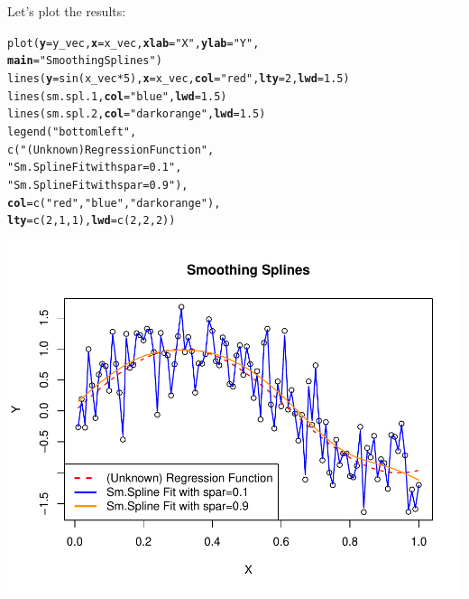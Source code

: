 \documentclass[14pt]{extreport}\usepackage[]{graphicx}\usepackage[]{xcolor}
\makeatletter
\def\maxwidth{ %
  \ifdim\Gin@nat@width>\linewidth
    \linewidth
  \else
    \Gin@nat@width
  \fi
}
\newcommand{\hlnum}[1]{\textcolor[rgb]{0.69,0.494,0}{#1}}%
\newcommand{\hlstr}[1]{\textcolor[rgb]{0.749,0.012,0.012}{#1}}%
\newcommand{\hlopt}[1]{\textcolor[rgb]{0,0,0}{#1}}%
\newcommand{\hlstd}[1]{\textcolor[rgb]{0,0,0}{#1}}%
\newcommand{\hlkwc}[1]{\textcolor[rgb]{0,0,0}{\textbf{#1}}}%
\newcommand{\hlkwd}[1]{\textcolor[rgb]{0.004,0.004,0.506}{#1}}%
\newenvironment{kframe}{%
 \def\at@end@of@kframe{}%
 \ifinner\ifhmode%
  \def\at@end@of@kframe{\end{minipage}}%
  \begin{minipage}{\columnwidth}%
 \fi\fi%
 \def\FrameCommand##1{\hskip\@totalleftmargin \hskip-\fboxsep
 \colorbox{shadecolor}{##1}\hskip-\fboxsep
     \hskip-\linewidth \hskip-\@totalleftmargin \hskip\columnwidth}%
 \MakeFramed {\advance\hsize-\width
   \@totalleftmargin\z@ \linewidth\hsize
   \@setminipage}}%
 {\par\unskip\endMakeFramed%
 \at@end@of@kframe}
\newenvironment{knitrout}{}{} %
\makeatother
\begin{document}
Let's plot the results:
\begin{knitrout}
\color{fgcolor}\begin{kframe}
\begin{alltt}
\hlkwd{plot}\hlstd{(}\hlkwc{y}\hlstd{=y_vec,} \hlkwc{x}\hlstd{=x_vec,} \hlkwc{xlab}\hlstd{=}\hlstr{"X"}\hlstd{,} \hlkwc{ylab}\hlstd{=}\hlstr{"Y"}\hlstd{,}
    \hlkwc{main}\hlstd{=}\hlstr{"Smoothing Splines"}\hlstd{)}
\hlkwd{lines}\hlstd{(}\hlkwc{y}\hlstd{=}\hlkwd{sin}\hlstd{(x_vec} \hlopt{*} \hlnum{5}\hlstd{),} \hlkwc{x}\hlstd{=x_vec,} \hlkwc{col}\hlstd{=}\hlstr{"red"}\hlstd{,} \hlkwc{lty}\hlstd{=}\hlnum{2}\hlstd{,} \hlkwc{lwd}\hlstd{=}\hlnum{1.5}\hlstd{)}
\hlkwd{lines}\hlstd{(sm.spl.1,} \hlkwc{col}\hlstd{=}\hlstr{"blue"}\hlstd{,}       \hlkwc{lwd}\hlstd{=}\hlnum{1.5}\hlstd{)}
\hlkwd{lines}\hlstd{(sm.spl.2,} \hlkwc{col}\hlstd{=}\hlstr{"darkorange"}\hlstd{,} \hlkwc{lwd}\hlstd{=}\hlnum{1.5}\hlstd{)}
\hlkwd{legend}\hlstd{(}\hlstr{"bottomleft"}\hlstd{,}
      \hlkwd{c}\hlstd{(}\hlstr{"(Unknown) Regression Function"}\hlstd{,}
        \hlstr{"Sm.Spline Fit with spar=0.1"}\hlstd{,}
        \hlstr{"Sm.Spline Fit with spar=0.9"}\hlstd{),}
      \hlkwc{col}\hlstd{=}\hlkwd{c}\hlstd{(}\hlstr{"red"}\hlstd{,}\hlstr{"blue"}\hlstd{,} \hlstr{"darkorange"}\hlstd{),}
      \hlkwc{lty}\hlstd{=}\hlkwd{c}\hlstd{(}\hlnum{2}\hlstd{,}\hlnum{1}\hlstd{,}\hlnum{1}\hlstd{),} \hlkwc{lwd}\hlstd{=}\hlkwd{c}\hlstd{(}\hlnum{2}\hlstd{,}\hlnum{2}\hlstd{,}\hlnum{2}\hlstd{))}
\end{alltt}
\end{kframe}

{\centering \includegraphics[width=\maxwidth]{figure/unnamed-chunk-17-1} 

}


\end{knitrout}
\end{document}
